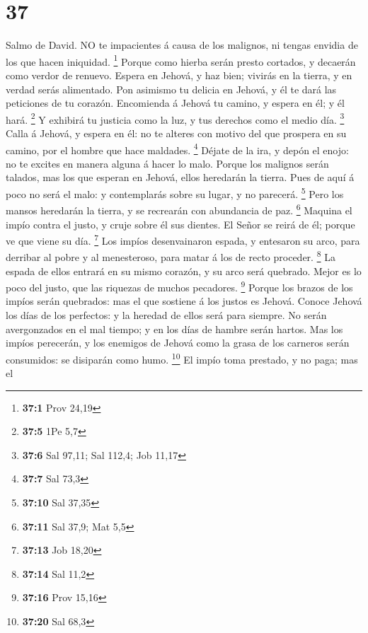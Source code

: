 \hypertarget{section-36}{%
\section{37}\label{section-36}}

 Salmo de David. NO te impacientes á causa de los malignos,
ni tengas envidia de los que hacen iniquidad. \footnote{\textbf{37:1}
  Prov 24,19}  Porque como hierba serán presto cortados, y
decaerán como verdor de renuevo.  Espera en Jehová, y haz
bien; vivirás en la tierra, y en verdad serás alimentado. 
Pon asimismo tu delicia en Jehová, y él te dará las peticiones de tu
corazón.  Encomienda á Jehová tu camino, y espera en él; y
él hará. \footnote{\textbf{37:5} 1Pe 5,7}  Y exhibirá tu
justicia como la luz, y tus derechos como el medio día. \footnote{\textbf{37:6}
  Sal 97,11; Sal 112,4; Job 11,17}  Calla á Jehová, y espera
en él: no te alteres con motivo del que prospera en su camino, por el
hombre que hace maldades. \footnote{\textbf{37:7} Sal 73,3} 
Déjate de la ira, y depón el enojo: no te excites en manera alguna á
hacer lo malo.  Porque los malignos serán talados, mas los
que esperan en Jehová, ellos heredarán la tierra.  Pues de
aquí á poco no será el malo: y contemplarás sobre su lugar, y no
parecerá. \footnote{\textbf{37:10} Sal 37,35}  Pero los
mansos heredarán la tierra, y se recrearán con abundancia de paz.
\footnote{\textbf{37:11} Sal 37,9; Mat 5,5}  Maquina el
impío contra el justo, y cruje sobre él sus dientes.  El
Señor se reirá de él; porque ve que viene su día. \footnote{\textbf{37:13}
  Job 18,20}  Los impíos desenvainaron espada, y entesaron
su arco, para derribar al pobre y al menesteroso, para matar á los de
recto proceder. \footnote{\textbf{37:14} Sal 11,2}  La
espada de ellos entrará en su mismo corazón, y su arco será quebrado.
 Mejor es lo poco del justo, que las riquezas de muchos
pecadores. \footnote{\textbf{37:16} Prov 15,16}  Porque los
brazos de los impíos serán quebrados: mas el que sostiene á los justos
es Jehová.  Conoce Jehová los días de los perfectos: y la
heredad de ellos será para siempre.  No serán avergonzados
en el mal tiempo; y en los días de hambre serán hartos. 
Mas los impíos perecerán, y los enemigos de Jehová como la grasa de los
carneros serán consumidos: se disiparán como humo. \footnote{\textbf{37:20}
  Sal 68,3}  El impío toma prestado, y no paga; mas el
